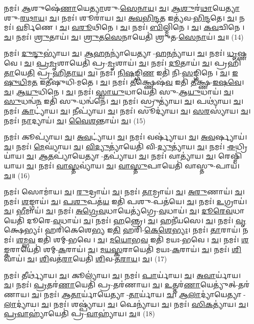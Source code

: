 𑌨𑌮𑌃॑। \ul{𑌆}𑌶𑍁𑌷𑍇॑\ul{𑌣𑌾}𑌯𑍇\ul{𑌤𑍍𑌯𑌾}𑌶𑍁-\ul{𑌸𑍇}\ul{𑌨𑌾}\ul{𑌯}। \ul{𑌚}। \ul{𑌆}\ul{𑌶𑍁}𑌰॑\ul{𑌥𑌾}𑌯𑍇\ul{𑌤𑍍𑌯𑌾}𑌶𑍁-\ul{𑌰}\ul{𑌥𑌾}\ul{𑌯}। \ul{𑌚}। 
𑌨𑌮𑌃॑। 𑌶𑍂𑌰𑌾॑𑌯। \ul{𑌚}। \ul{𑌅}\ul{𑌵}\ul{𑌭𑌿}\ul{𑌨𑍍𑌦}𑌤 𑌇𑌤𑍍𑌯॑𑌵-\ul{𑌭𑌿}\ul{𑌨𑍍𑌦}𑌤𑍇। \ul{𑌚}। 
𑌨𑌮𑌃॑। \ul{𑌵}𑌰𑍍𑌮𑌿𑌣𑍇। \ul{𑌚}। \ul{𑌵}\ul{𑌰𑍂}𑌥𑌿𑌨𑍇। \ul{𑌚}। 
𑌨𑌮𑌃॑। \ul{𑌬𑌿}𑌲𑍍𑌮𑌿𑌨𑍇। \ul{𑌚}। \ul{𑌕}\ul{𑌵}𑌚𑌿𑌨𑍇। \ul{𑌚}। 
𑌨𑌮𑌃॑। \ul{𑌶𑍍𑌰𑍁}𑌤𑌾𑌯॑। \ul{𑌚}। \ul{𑌶𑍍𑌰𑍁}\ul{𑌤}\ul{𑌸𑍇}𑌨𑌾𑌯𑍇𑌤𑌿॑ 𑌶𑍍𑌰𑍁𑌤-\ul{𑌸𑍇}\ul{𑌨𑌾}𑌯॑। \ul{𑌚}॥ (14)


𑌨𑌮𑌃॑। \ul{𑌦𑍁}\ul{𑌨𑍍𑌦𑍁}𑌭𑍍𑌯𑌾॑𑌯। \ul{𑌚}। \ul{𑌆}\ul{𑌹}\ul{𑌨}𑌨𑍍𑌯𑌾॑𑌯𑍇𑌤𑍍𑌯𑌾-\ul{𑌹}\ul{𑌨}𑌨𑍍𑌯𑌾॑𑌯। \ul{𑌚}। 
𑌨𑌮𑌃॑। \ul{𑌧𑍃}𑌷𑍍𑌣𑌵𑍇। \ul{𑌚}। \ul{𑌪𑍍𑌰}\ul{𑌮𑍃}𑌶𑌾𑌯𑍇𑌤𑌿॑ 𑌪𑍍𑌰-\ul{𑌮𑍃}𑌶𑌾𑌯॑। \ul{𑌚}। 
𑌨𑌮𑌃॑। \ul{𑌦𑍂}𑌤𑌾𑌯॑। \ul{𑌚}। 𑌪𑍍𑌰𑌹𑌿॑\ul{𑌤𑌾}𑌯𑍇\ul{𑌤𑌿} 𑌪𑍍𑌰-\ul{𑌹𑌿}\ul{𑌤𑌾}\ul{𑌯}। \ul{𑌚}। 
𑌨𑌮𑌃॑। \ul{𑌨𑌿}\ul{𑌷}𑌙𑍍𑌗𑌿\ul{𑌣} 𑌇𑌤𑌿॑ 𑌨𑌿-\ul{𑌸}𑌙𑍍𑌗𑌿𑌨𑍇। \ul{𑌚}। \ul{𑌇}\ul{𑌷𑍁}\ul{𑌧𑌿}𑌮\ul{𑌤} 𑌇𑌤𑍀॑𑌷𑍁𑌧𑌿-𑌮𑌤𑍇। \ul{𑌚}। 
𑌨𑌮𑌃॑। \ul{𑌤𑍀}𑌕𑍍𑌷𑍍𑌣𑍇𑌷॑\ul{𑌵} 𑌇𑌤𑌿॑ \ul{𑌤𑍀}𑌕𑍍𑌷𑍍𑌣-\ul{𑌇}\ul{𑌷}\ul{𑌵𑍇}। \ul{𑌚}। \ul{𑌆}\ul{𑌯𑍁}𑌧𑌿𑌨𑍇। \ul{𑌚}। 
𑌨𑌮𑌃॑। \ul{𑌸𑍍𑌵𑌾}\ul{𑌯𑍁}𑌧𑌾𑌯𑍇𑌤𑌿॑ 𑌸𑍁-\ul{𑌆}\ul{𑌯𑍁}𑌧𑌾𑌯॑। \ul{𑌚}। \ul{𑌸𑍁}𑌧𑌨𑍍𑌵॑\ul{𑌨} 𑌇𑌤𑌿॑ 𑌸𑍁-𑌧𑌨𑍍𑌵॑𑌨𑍇। \ul{𑌚}। 
𑌨𑌮𑌃॑। 𑌸𑍍𑌰𑍁𑌤𑍍𑌯𑌾॑𑌯। \ul{𑌚}। 𑌪𑌥𑍍𑌯𑌾॑𑌯। \ul{𑌚}। 
𑌨𑌮𑌃॑। \ul{𑌕𑌾}𑌟𑍍𑌯𑌾॑𑌯। \ul{𑌚}। \ul{𑌨𑍀}𑌪𑍍𑌯𑌾॑𑌯। \ul{𑌚}। 
𑌨𑌮𑌃॑। 𑌸𑍂𑌦𑍍𑌯𑌾॑𑌯। \ul{𑌚}। \ul{𑌸}\ul{𑌰}𑌸𑍍𑌯𑌾॑𑌯। \ul{𑌚}। 
𑌨𑌮𑌃॑। \ul{𑌨𑌾}𑌦𑍍𑌯𑌾𑌯॑। \ul{𑌚}। \ul{𑌵𑍈}\ul{𑌶}𑌨𑍍𑌤𑌾𑌯॑। \ul{𑌚}। (15)


𑌨𑌮𑌃॑। 𑌕𑍂𑌪𑍍𑌯𑌾॑𑌯। \ul{𑌚}। \ul{𑌅}\ul{𑌵}𑌟𑍍𑌯𑌾॑𑌯। \ul{𑌚}। 
𑌨𑌮𑌃॑। 𑌵𑌰𑍍𑌷𑍍𑌯𑌾॑𑌯। \ul{𑌚}। \ul{𑌅}\ul{𑌵}𑌰𑍍𑌷𑍍𑌯𑌾𑌯॑। \ul{𑌚}। 
𑌨𑌮𑌃॑। \ul{𑌮𑍇}𑌘𑍍𑌯𑌾॑𑌯। \ul{𑌚}। \ul{𑌵𑌿}\ul{𑌦𑍍𑌯𑍁}𑌤𑍍𑌯𑌾॑𑌯𑍇𑌤𑌿॑ 𑌵𑌿-\ul{𑌦𑍍𑌯𑍁}𑌤𑍍𑌯𑌾॑𑌯। \ul{𑌚}। 
𑌨𑌮𑌃॑। \ul{𑌈}𑌧𑍍𑌰𑌿𑌯𑌾॑𑌯। \ul{𑌚}। \ul{𑌆}\ul{𑌤}𑌪𑍍𑌯𑌾॑𑌯𑍇𑌤𑍍𑌯𑌾-\ul{𑌤}𑌪𑍍𑌯𑌾॑𑌯। \ul{𑌚}। 
𑌨𑌮𑌃॑। 𑌵𑌾𑌤𑍍𑌯𑌾॑𑌯। \ul{𑌚}। 𑌰𑍇𑌷𑍍𑌮𑌿॑𑌯𑌾𑌯। \ul{𑌚}। 
𑌨𑌮𑌃॑। \ul{𑌵𑌾}\ul{𑌸𑍍𑌤}𑌵𑍍𑌯𑌾॑𑌯। \ul{𑌚}। \ul{𑌵𑌾}\ul{𑌸𑍍𑌤𑍁}𑌪𑌾𑌯𑍇𑌤𑌿॑ 𑌵𑌾𑌸𑍍𑌤𑍁-𑌪𑌾𑌯॑। \ul{𑌚}॥ (16)


𑌨𑌮𑌃॑। 𑌸𑍋𑌮𑌾॑𑌯। \ul{𑌚}। \ul{𑌰𑍁}𑌦𑍍𑌰𑌾𑌯॑। \ul{𑌚}। 
𑌨𑌮𑌃॑। \ul{𑌤𑌾}𑌮𑍍𑌰𑌾𑌯॑। \ul{𑌚}। \ul{𑌅}\ul{𑌰𑍁}𑌣𑌾𑌯॑। \ul{𑌚}। 
𑌨𑌮𑌃॑। \ul{𑌶}𑌙𑍍𑌗𑌾𑌯॑। \ul{𑌚}। \ul{𑌪}\ul{𑌶𑍁}𑌪𑌤॑\ul{𑌯} 𑌇𑌤𑌿॑ 𑌪𑌶𑍁-𑌪𑌤॑𑌯𑍇। \ul{𑌚}। 
𑌨𑌮𑌃॑। \ul{𑌉}𑌗𑍍𑌰𑌾𑌯॑। \ul{𑌚}। \ul{𑌭𑍀}𑌮𑌾𑌯॑। \ul{𑌚}। 
𑌨𑌮𑌃॑। \ul{𑌅}\ul{𑌗𑍍𑌰𑍇}\ul{𑌵}𑌧𑌾𑌯𑍇𑌤𑍍𑌯॑𑌗𑍍𑌰𑍇-\ul{𑌵}𑌧𑌾𑌯॑। \ul{𑌚}। \ul{𑌦𑍂}\ul{𑌰𑍇}\ul{𑌵}𑌧𑌾𑌯𑍇𑌤𑌿॑ 𑌦𑍂𑌰𑍇-\ul{𑌵}𑌧𑌾𑌯॑। \ul{𑌚}। 
𑌨𑌮𑌃॑। \ul{𑌹}𑌨𑍍𑌤𑍍𑌰𑍇। \ul{𑌚}। 𑌹𑌨𑍀॑𑌯𑌸𑍇। \ul{𑌚}। 
𑌨𑌮𑌃॑। \ul{𑌵𑍃}𑌕𑍍𑌷𑍇𑌭𑍍𑌯𑌃॑। 𑌹𑌰𑌿॑𑌕𑍇𑌶𑍇\ul{𑌭𑍍𑌯} 𑌇\ul{𑌤𑌿} 𑌹𑌰𑌿॑-\ul{𑌕𑍇}\ul{𑌶𑍇}\ul{𑌭𑍍𑌯𑌃}। 
𑌨𑌮𑌃॑। \ul{𑌤𑌾}𑌰𑌾𑌯॑। 𑌨𑌮𑌃॑। \ul{𑌶}𑌮𑍍𑌭\ul{𑌵} 𑌇𑌤𑌿॑ 𑌶𑌮𑍍-𑌭𑌵𑍇। \ul{𑌚}। \ul{𑌮}\ul{𑌯𑍋}𑌭\ul{𑌵} 𑌇𑌤𑌿॑ 𑌮𑌯𑌃-𑌭𑌵𑍇। \ul{𑌚}। 
𑌨𑌮𑌃॑। \ul{𑌶}\ul{𑌙𑍍𑌕}𑌰𑌾𑌯𑍇𑌤𑌿॑ 𑌶𑌮𑍍-\ul{𑌕}𑌰𑌾𑌯॑। \ul{𑌚}। \ul{𑌮}\ul{𑌯}\ul{𑌸𑍍𑌕}𑌰𑌾𑌯𑍇𑌤𑌿॑ 𑌮𑌯𑌃-\ul{𑌕}𑌰𑌾𑌯॑। \ul{𑌚}। 
𑌨𑌮𑌃॑। \ul{𑌶𑌿}𑌵𑌾𑌯॑। \ul{𑌚}। \ul{𑌶𑌿}𑌵𑌤॑\ul{𑌰𑌾}𑌯𑍇𑌤𑌿॑ \ul{𑌶𑌿}𑌵-\ul{𑌤}\ul{𑌰𑌾}\ul{𑌯}। \ul{𑌚}। (17)


𑌨𑌮𑌃॑। 𑌤𑍀𑌰𑍍𑌥𑍍𑌯𑌾॑𑌯। \ul{𑌚}। 𑌕𑍂𑌲𑍍𑌯𑌾॑𑌯। \ul{𑌚}। 
𑌨𑌮𑌃॑। \ul{𑌪𑌾}𑌰𑍍𑌯𑌾॑𑌯। \ul{𑌚}। \ul{𑌅}\ul{𑌵𑌾}𑌰𑍍𑌯𑌾॑𑌯। \ul{𑌚}। 
𑌨𑌮𑌃॑। \ul{𑌪𑍍𑌰}𑌤𑌰॑\ul{𑌣𑌾}𑌯𑍇𑌤𑌿॑ 𑌪𑍍𑌰-𑌤𑌰॑𑌣𑌾𑌯। \ul{𑌚}। \ul{𑌉}\ul{𑌤𑍍𑌤}𑌰॑\ul{𑌣𑌾}𑌯𑍇𑌤𑍍𑌯𑍁॑𑌤𑍍-𑌤𑌰॑𑌣𑌾𑌯। \ul{𑌚}। 
𑌨𑌮𑌃॑। \ul{𑌆}\ul{𑌤𑌾}𑌰𑍍𑌯𑌾॑𑌯𑍇𑌤𑍍𑌯𑌾-\ul{𑌤𑌾}𑌰𑍍𑌯𑌾॑𑌯। \ul{𑌚}। \ul{𑌆}\ul{𑌲𑌾}𑌦𑍍𑌯𑌾॑𑌯𑍇𑌤𑍍𑌯𑌾-\ul{𑌲𑌾}𑌦𑍍𑌯𑌾॑𑌯। \ul{𑌚}। 
𑌨𑌮𑌃॑। 𑌶𑌷𑍍𑌪𑍍𑌯𑌾॑𑌯। \ul{𑌚}। 𑌫𑍇𑌨𑍍𑌯𑌾॑𑌯। \ul{𑌚}। 
𑌨𑌮𑌃॑। \ul{𑌸𑌿}\ul{𑌕}𑌤𑍍𑌯𑌾॑𑌯। \ul{𑌚}। \ul{𑌪𑍍𑌰}\ul{𑌵𑌾}𑌹𑍍𑌯𑌾॑𑌯𑍇𑌤𑌿॑ 𑌪𑍍𑌰-\ul{𑌵𑌾}𑌹𑍍𑌯𑌾॑𑌯। \ul{𑌚}॥ (18)


